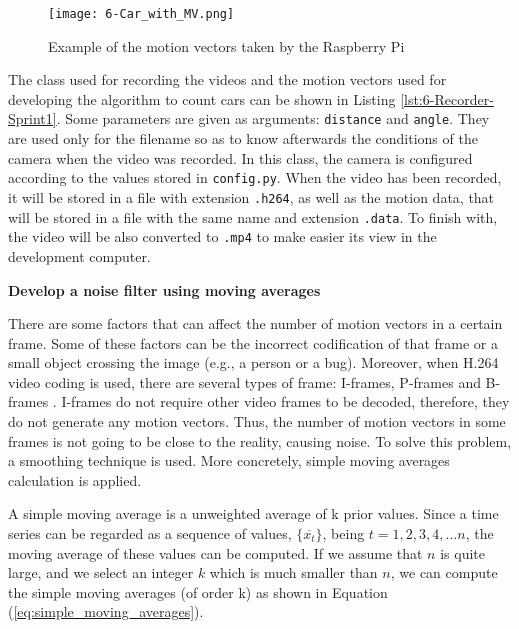 \begin{figure}[!h]
	\begin{center}
		\texttt{[image: 6-Car\_with\_MV.png]}
		\caption{Example of  the motion vectors taken by the Raspberry Pi}
		\label{fig:6-Car_with_MV}
	\end{center}
\end{figure}

The class used for recording the videos and the motion vectors used for developing the algorithm to count cars can be shown in Listing \ref{lst:6-Recorder-Sprint1}. Some parameters are given as arguments: \texttt{distance} and \texttt{angle}. They are used only for the filename so as to know afterwards the conditions of the camera when the video was recorded. In this class, the camera is configured according to the values stored in \texttt{config.py}. When the video has been recorded, it will be stored in a file with extension \texttt{.h264}, as well as the motion data, that will be stored in a file with the same name and extension \texttt{.data}. To finish with, the video will be also converted to \texttt{.mp4} to make easier its view in the development computer. 




\textbf{Develop a noise filter using moving averages}

There are some factors that can affect the number of motion vectors in a certain frame. Some of these factors can be the incorrect codification of that frame or a small object crossing the image (e.g., a person or a bug). Moreover, when H.264 video coding is used, there are several types of frame: I-frames, P-frames and B-frames . I-frames do not require other video frames to be decoded, therefore, they do not generate any motion vectors. Thus, the number of motion vectors in some frames is not going to be close to the reality, causing noise. To solve this problem, a smoothing technique is used. More concretely, simple moving averages calculation is applied.

A simple moving average \cite{Smi15} is a unweighted average of k prior values. Since a time series can be regarded as a sequence of values, $\{\overline {x_{t}}\}$, being $t=1,2,3,4,…n$, the moving average of these values can be computed. If we assume that $n$ is quite large, and we select an integer $k$ which is much smaller than $n$, we can compute the simple moving averages (of order k) as shown in Equation (\ref{eq:simple_moving_averages}).

